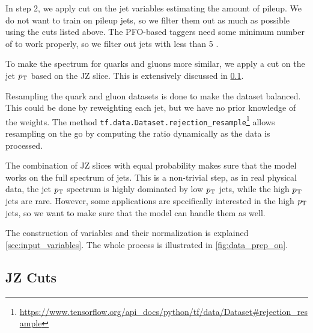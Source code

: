 In step 2, we apply cut on the jet variables estimating the amount of pileup.
We do not want to train on pileup jets, so we filter them out as much as possible using the cuts listed above.
The PFO-based taggers need some minimum number of \PFOs to work properly, so we filter out jets with less than 5 \PFOs.

To make the spectrum for quarks and gluons more similar, we apply a cut on the jet $p_\text{T}$ based on the JZ slice.
This is extensively discussed in \cref{sec:jet_pt_cuts}.

Resampling the quark and gluon datasets is done to make the dataset balanced.
This could be done by reweighting each jet, but we have no prior knowledge of the weights.
The method \texttt{tf.data.Dataset.rejection\_resample}\footnote{\url{https://www.tensorflow.org/api_docs/python/tf/data/Dataset\#rejection\_resample}} allows resampling on the go by computing the ratio dynamically as the data is processed.

The combination of JZ slices with equal probability makes sure that the model works on the full spectrum of jets. 
This is a non-trivial step, as in real physical data, the jet $p_\text{T}$ spectrum is highly dominated by low $p_\text{T}$ jets, while the high $p_\text{T}$ jets are rare. 
However, some applications are specifically interested in the high $p_\text{T}$ jets, so we want to make sure that the model can handle them as well.

The construction of variables and their normalization is explained \cref{sec:input_variables}.
The whole process is illustrated in \cref{fig:data_prep_on}.


\subsection{JZ Cuts}
\label{sec:jet_pt_cuts}

